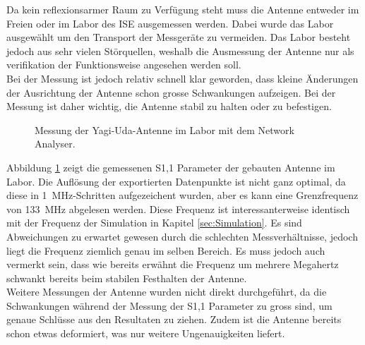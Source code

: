 Da kein reflexionsarmer Raum zu Verfügung steht muss die Antenne entweder im Freien oder im Labor des ISE ausgemessen werden. Dabei wurde das Labor ausgewählt um den Transport der Messgeräte zu vermeiden. Das Labor besteht jedoch aus sehr vielen Störquellen, weshalb die Ausmessung der Antenne nur als verifikation der Funktionsweise angesehen werden soll.\\
Bei der Messung ist jedoch relativ schnell klar geworden, dass kleine Änderungen der Ausrichtung der Antenne schon grosse Schwankungen aufzeigen. Bei der Messung ist daher wichtig, die Antenne stabil zu halten oder zu befestigen.

\newpage

\begin{figure}[!ht]
\centering
{}
\caption{Messung der Yagi-Uda-Antenne im Labor mit dem Network Analyser.}
\label{fig:Messung_S11}
\end{figure}

Abbildung \ref{fig:Messung_S11} zeigt die gemessenen S1,1 Parameter der gebauten Antenne im Labor. Die Auflösung der exportierten Datenpunkte ist nicht ganz optimal, da diese in \SI{1}{MHz}-Schritten aufgezeichent wurden, aber es kann eine Grenzfrequenz von \SI{133}{MHz} abgelesen werden. Diese Frequenz ist interessanterweise identisch mit der Frequenz der Simulation in Kapitel \ref{sec:Simulation}. Es sind Abweichungen zu erwartet gewesen durch die schlechten Messverhältnisse, jedoch liegt die Frequenz ziemlich genau im selben Bereich. Es muss jedoch auch vermerkt sein, dass wie bereits erwähnt die Frequenz um mehrere Megahertz schwankt bereits beim stabilen Festhalten der Antenne.\\

Weitere Messungen der Antenne wurden nicht direkt durchgeführt, da die Schwankungen während der Messung der S1,1 Parameter zu gross sind, um genaue Schlüsse aus den Resultaten zu ziehen. Zudem ist die Antenne bereits schon etwas deformiert, was nur weitere Ungenauigkeiten liefert.
